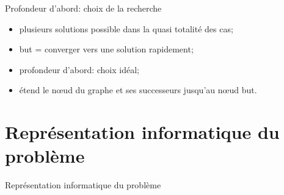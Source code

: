 \documentclass{beamer}
\begin{document}
\begin{frame}{Profondeur d'abord: choix de la recherche}

	\begin{itemize}
		\item plusieurs solutions possible dans la quasi totalité des cas;
		\item but = converger vers une solution rapidement;
		\item profondeur d'abord: choix idéal;
		\item étend le nœud du graphe et ses successeurs jusqu'au nœud but.
	\end{itemize}

\end{frame}

	\section{Représentation informatique du problème}
	
\begin{frame}{Représentation informatique du problème}

\end{frame}


	
\end{document}
